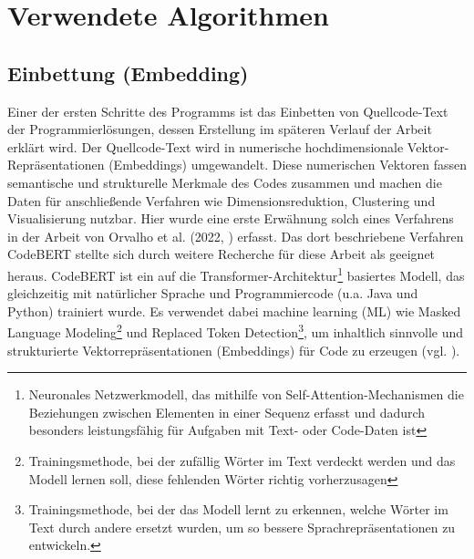 \section{Verwendete Algorithmen}

\subsection{Einbettung (Embedding)}
Einer der ersten Schritte des Programms ist das Einbetten von Quellcode-Text der Programmierlösungen, dessen Erstellung im späteren Verlauf der Arbeit erklärt wird. Der Quellcode-Text wird in numerische hochdimensionale Vektor-Repräsentationen (Embeddings) umgewandelt. Diese numerischen Vektoren fassen semantische und strukturelle Merkmale des Codes zusammen und machen die Daten für anschließende Verfahren wie Dimensionsreduktion, Clustering und Visualisierung nutzbar. Hier wurde eine erste Erwähnung solch eines Verfahrens in der Arbeit von Orvalho et al. (2022, \cite{Orvalho.28.06.2022}) erfasst. Das dort beschriebene Verfahren CodeBERT stellte sich durch weitere Recherche für diese Arbeit als geeignet heraus. CodeBERT ist ein auf die Transformer-Architektur\footnote{Neuronales Netzwerkmodell, das mithilfe von Self-Attention-Mechanismen die Beziehungen zwischen Elementen in einer Sequenz erfasst und dadurch besonders leistungsfähig für Aufgaben mit Text- oder Code-Daten ist} basiertes Modell, das gleichzeitig mit natürlicher Sprache und Programmiercode (u.a. Java und Python) trainiert wurde. Es verwendet dabei machine learning (ML) wie Masked Language Modeling\footnote{Trainingsmethode, bei der zufällig Wörter im Text verdeckt werden und das Modell lernen soll, diese fehlenden Wörter richtig vorherzusagen} und Replaced Token Detection\footnote{Trainingsmethode, bei der das Modell lernt zu erkennen, welche Wörter im Text durch andere ersetzt wurden, um so bessere Sprachrepräsentationen zu entwickeln.}, um inhaltlich sinnvolle und strukturierte Vektorrepräsentationen (Embeddings) für Code zu erzeugen (vgl. \cite{Feng.19.02.2020}).

